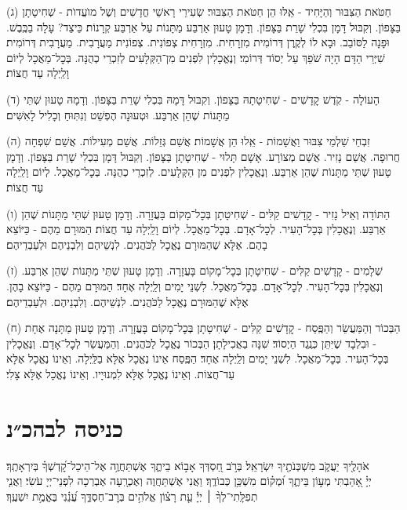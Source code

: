 \documentclass[twoside, openany, parskip=half, 11pt]{book}
\begin{document}
(ג) חַטֹּאת הַצִּבּוּר וְהַיָּחִיד - אֵֽלּוּ הֵן חַטֹּאת הַצִּבּוּר׃ שְׂעִירֵי רָאשֵׁי חֳדָשִׁים וְשֶׁל מוׁעֲדוׂת - שְׁחִיטָתָן בַּצָּפוֹן. וְקִבּוּל דָּמָן בִּכְלִי שָׁרֵת בַּצָּפוֹן. וְדָמָן טָעוּן אַרְבַּע מַתָּנוֹת עַל אַרְבַּע קְרָנוֹת׃ כֵּיצַד? עָלָה בַכֶּֽבֶשׁ. וּפָנָה לַסּוֹבֵב. וּבָא לוֹ לְקֶֽרֶן דְּרוֹמִית מִזְרָחִית. מִזְרָחִית צְפוֹנִית. צְפוֹנִית מַעֲרָבִית. מַעֲרָבִית דְּרוֹמִית׃ שִׁיְּרֵי הַדָּם הָיָה שֹׁפֵךְ עַל יְסוֹד דְּרוֹמִי׃ וְנֶאֱכָלִין לִפְנִים מִן־הַקְּלָעִים לְזִכְרֵי כְהֻנָּה. בְּכׇל־מַאֲכָל לְיוֹם וָלַֽיְלָה עַד חֲצוֹת׃

(ד) הָעוֹלָה - קֹֽדֶשׁ קׇדָשִׁים - שְׁחִיטָתָהּ בַּצָּפוֹן. וְקִבּוּל דָּמָהּ בִּכְלִי שָׁרֵת בַּצָּפוֹן. וְדָמָהּ טָעוּן שְׁתֵּי מַתָּנוֹת שֶׁהֵן אַרְבַּע. וּטְעוּנָה הֶפְשֵׁט וְנִתּֽוּחַ וְכָלִיל לָאִשִּׁים׃

(ה) זִבְחֵי שַׁלְמֵי צִבּוּר וַאֲשָׁמוֹת - אֵֽלוּ הֵן אֲשָׁמוֹת׃ אֲשַׁם גְּזֵלוֹת. אֲשַׁם מְעִילוֹת. אֲשַׁם שִׁפְחָה חֲרוּפָה. אֲשַׁם נָזִיר. אֲשַׁם מְצוֹרָע. אָשָׁם תָּלוּי - שְׁחִיטָתָן בַּצָּפוֹן. וְקִבּוּל דָּמָן בִּכְלִי שָׁרֵת בַּצָּפוֹן. וְדָמָן טָעוּן שְׁתֵּי מַתָּנוֹת שֶׁהֵן אַרְבַּע. וְנֶאֱכָלִין לִפְנִים מִן הַקְּלָעִים. לְזִכְרֵי כְהֻנָּה. בְּכׇל־מַאֲכָל. לְיוֹם וָלַֽיְלָה עַד חֲצוֹת׃

(ו) הַתּוֹדָה וְאֵיל נָזִיר - קׇדָשִׁים קַלִּים - שְׁחִיטָתָן בְּכׇל־מָקוֹם בָּעֲזָרָה. וְדָמָן טָעוּן שְׁתֵּי מַתָּנוֹת שֶׁהֵן אַרְבַּע. וְנֶאֱכָלִין בְּכׇל־הָעִיר. לְכׇל־אָדָם. בְּכׇל־מַאֲכָל. לְיוֹם וָלַֽיְלָה עַד חֲצוֹת׃ הַמּוּרָם מֵהֶם - כַּיּוֹצֵא בָהֶם. אֶלָּא שֶׁהַמּוּרָם נֶאֱכָל לַכֹּהֲנִים. לִנְשֵׁיהֶם וְלִבְנֵיהֶם וּלְעַבְדֵיהֶם׃

(ז) שְׁלָמִים - קׇדָשִׁים קַלִּים - שְׁחִיטָתָן בְּכׇל־מָקוֹם בָּעֲזָרָה. וְדָמָן טָעוּן שְׁתֵּי מַתָּנוֹת שֶׁהֵן אַרְבַּע. וְנֶאֱכָלִין בְּכׇל־הָעִיר. לְכׇל־אָדָם. בְּכׇל־מַאֲכָל. לִשְׁנֵי יָמִים וְלַֽיְלָה אֶחָד׃ הַמּוּרָם מֵהֶם - כַּיּוֹצֵא בָהֶן. אֶלָּא שֶׁהַמּוּרָם נֶאֱכָל לַכֹּהֲנִים. לִנְשֵׁיהֶם. וְלִבְנֵיהֶם. וּלְעַבְדֵיהֶם׃

(ח) הַבְּכוֹר וְהַמַּעֲשֵׂר וְהַפֶּֽסַח - קׇדָשִׁים קַלִּים - שְׁחִיטָתָן בְּכׇל־מָקוֹם בָּעֲזָרָה. וְדָמָן טָעוּן מַתָּנָה אֶחָת - וּבִלְבָד שֶׁיִּתֵּן כְּנֶֽגֶד הַיְסוֹד׃ שִׁנָּה בַאֲכִילָתָן׃ הַבְּכוֹר נֶאֱכָל לַכֹּהֲנִים. וְהַמַּעֲשֵׂר לְכׇל־אָדָם. וְנֶּאֱכָלִין בְּכׇל־הָעִיר. בְּכׇל־מַאֲכָל. לִשְׁנֵי יָמִים וְלַֽיְלָה אֶחָד׃ הַפֶּֽסַח אֵינוֹ נֶאֱכָל אֶלָּא בַלַּֽיְלָה. וְאֵינוֹ נֶאֱכָל אֶלָּא עַד־חֲצוֹת. וְאֵינוֹ נֶאֱכָל אֶלָּא לִמְנוּיָיו. וְאֵינוֹ נֶאֱכָל אֶלָּא צָלִי׃\\


\section[כניסה לבהכ״נ]{ כניסה לבהכ״נ }
אֹהָלֶ֖יךָ יַעֲקֹ֑ב מִשְׁכְּנֹתֶ֖יךָ יִשְׂרָאֵֽל׃
בְּרֹ֣ב חַ֭סְדְּךָ אָב֣וֹא בֵיתֶ֑ךָ אֶשְׁתַּחֲוֶ֥ה אֶל־הֵיכַל־קׇ֝דְשְׁךָ֗ בְּיִרְאָתֶֽךָ׃\\
יְיָ֗ אָ֭הַבְתִּי מְע֣וֹן בֵּיתֶ֑ךָ וּ֝מְק֗וֹם מִשְׁכַּ֥ן כְּבוֹדֶֽךָ׃
וַאֲנִי אֶשְׁתַּחֲוֶה וְאֶכְרָֽעָה אֶבְרְכָה לִפְנֵי־יְיָ עֹשִׂי׃
וַאֲנִ֤י
%
תְפִלָּֽתִי־לְךָ֨ ׀ יְיָ֡ עֵ֤ת רָצ֗וֹן אֱלֹהִ֥ים בְּרׇב־חַסְדֶּ֑ךָ עֲ֝נֵ֗נִי בֶּאֱמֶ֥ת יִשְׁעֶֽךָ׃
\end{document}
